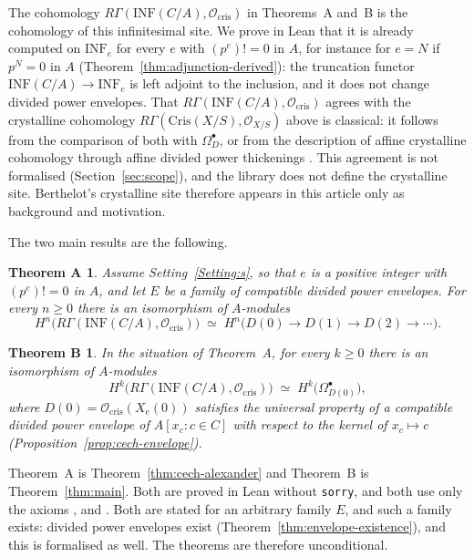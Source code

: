 \documentclass[11pt]{amsart}
\newcommand{\spa}{\medskip}
\newcommand{\Ocris}{\mathcal{O}_{\mathrm{cris}}}
\newcommand{\INF}{\mathrm{INF}}
\theoremstyle{plain}
\newtheorem*{theoremA}{Theorem A}
\newtheorem*{theoremB}{Theorem B}
\theoremstyle{definition}
\theoremstyle{remark}
\begin{document}
\spa

The cohomology $R\Gamma(\INF(C/A), \Ocris)$ in Theorems~A and~B is the cohomology of this infinitesimal site. We prove in Lean that it is already computed on $\INF_e$ for every $e$ with $(p^e)! = 0$ in $A$, for instance for $e = N$ if $p^N = 0$ in $A$ (Theorem~\ref{thm:adjunction-derived}): the truncation functor $\INF(C/A) \to \INF_e$ is left adjoint to the inclusion, and it does not change divided power envelopes. That $R\Gamma(\INF(C/A), \Ocris)$ agrees with the crystalline cohomology $R\Gamma(\mathrm{Cris}(X/S), \mathcal{O}_{X/S})$ above is classical: it follows from the comparison of both with $\Omega^\bullet_D$, or from the description of affine crystalline cohomology through affine divided power thickenings \cite[Tag~07JK]{stacks}. This agreement is not formalised (Section~\ref{sec:scope}), and the library does not define the crystalline site. Berthelot's crystalline site therefore appears in this article only as background and motivation.

\spa

The two main results are the following.

\begin{theoremA}
Assume Setting~\ref{Setting:s}, so that $e$ is a positive integer with $(p^e)! = 0$ in $A$, and let $E$ be a family of compatible divided power envelopes. For every $n \ge 0$ there is an isomorphism of $A$-modules
\[
H^n\big(R\Gamma(\INF(C/A), \Ocris)\big) \;\simeq\; H^n\big(D(0) \to D(1) \to D(2) \to \cdots\big).
\]
\end{theoremA}

\begin{theoremB}
In the situation of Theorem~A, for every $k \ge 0$ there is an isomorphism of $A$-modules
\[
H^k\big(R\Gamma(\INF(C/A), \Ocris)\big) \;\simeq\; H^k\big(\Omega^\bullet_{D(0)}\big),
\]
where $D(0) = \Ocris(X_e(0))$ satisfies the universal property of a compatible divided power envelope of $A[x_c : c \in C]$ with respect to the kernel of $x_c \mapsto c$ (Proposition~\ref{prop:cech-envelope}).
\end{theoremB}

Theorem~A is Theorem~\ref{thm:cech-alexander} and Theorem~B is Theorem~\ref{thm:main}. Both are proved in Lean without \texttt{sorry}, and both use only the axioms ,  and . Both are stated for an arbitrary family $E$, and such a family exists: divided power envelopes exist (Theorem~\ref{thm:envelope-existence}), and this is formalised as well. The theorems are therefore unconditional.
\end{document}
